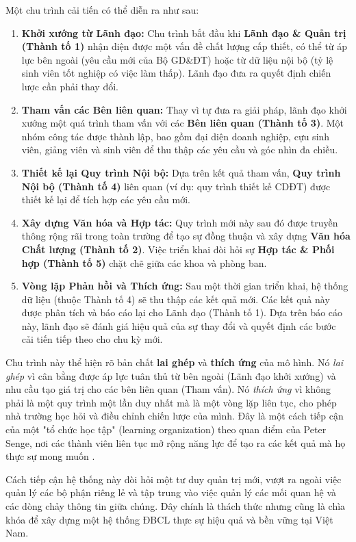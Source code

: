 \documentclass[12pt, a4paper, openany]{report}
\begin{document}
Một chu trình cải tiến có thể diễn ra như sau:
\begin{enumerate}
    \item \textbf{Khởi xướng từ Lãnh đạo:} Chu trình bắt đầu khi \textbf{Lãnh đạo \& Quản trị (Thành tố 1)} nhận diện được một vấn đề chất lượng cấp thiết, có thể từ áp lực bên ngoài (yêu cầu mới của Bộ GD\&ĐT) hoặc từ dữ liệu nội bộ (tỷ lệ sinh viên tốt nghiệp có việc làm thấp). Lãnh đạo đưa ra quyết định chiến lược cần phải thay đổi.
    \item \textbf{Tham vấn các Bên liên quan:} Thay vì tự đưa ra giải pháp, lãnh đạo khởi xướng một quá trình tham vấn với các \textbf{Bên liên quan (Thành tố 3)}. Một nhóm công tác được thành lập, bao gồm đại diện doanh nghiệp, cựu sinh viên, giảng viên và sinh viên để thu thập các yêu cầu và góc nhìn đa chiều.
    \item \textbf{Thiết kế lại Quy trình Nội bộ:} Dựa trên kết quả tham vấn, \textbf{Quy trình Nội bộ (Thành tố 4)} liên quan (ví dụ: quy trình thiết kế CDĐT) được thiết kế lại để tích hợp các yêu cầu mới.
    \item \textbf{Xây dựng Văn hóa và Hợp tác:} Quy trình mới này sau đó được truyền thông rộng rãi trong toàn trường để tạo sự đồng thuận và xây dựng \textbf{Văn hóa Chất lượng (Thành tố 2)}. Việc triển khai đòi hỏi sự \textbf{Hợp tác \& Phối hợp (Thành tố 5)} chặt chẽ giữa các khoa và phòng ban.
    \item \textbf{Vòng lặp Phản hồi và Thích ứng:} Sau một thời gian triển khai, hệ thống dữ liệu (thuộc Thành tố 4) sẽ thu thập các kết quả mới. Các kết quả này được phân tích và báo cáo lại cho Lãnh đạo (Thành tố 1). Dựa trên báo cáo này, lãnh đạo sẽ đánh giá hiệu quả của sự thay đổi và quyết định các bước cải tiến tiếp theo cho chu kỳ mới.
\end{enumerate}
Chu trình này thể hiện rõ bản chất \textbf{lai ghép} và \textbf{thích ứng} của mô hình. Nó \textit{lai ghép} vì cân bằng được áp lực tuân thủ từ bên ngoài (Lãnh đạo khởi xướng) và nhu cầu tạo giá trị cho các bên liên quan (Tham vấn). Nó \textit{thích ứng} vì không phải là một quy trình một lần duy nhất mà là một vòng lặp liên tục, cho phép nhà trường học hỏi và điều chỉnh chiến lược của mình. Đây là một cách tiếp cận của một "tổ chức học tập" (learning organization) theo quan điểm của Peter Senge, nơi các thành viên liên tục mở rộng năng lực để tạo ra các kết quả mà họ thực sự mong muốn \cite{Senge2006}.

Cách tiếp cận hệ thống này đòi hỏi một tư duy quản trị mới, vượt ra ngoài việc quản lý các bộ phận riêng lẻ và tập trung vào việc quản lý các mối quan hệ và các dòng chảy thông tin giữa chúng. Đây chính là thách thức nhưng cũng là chìa khóa để xây dựng một hệ thống ĐBCL thực sự hiệu quả và bền vững tại Việt Nam.
\end{document}
